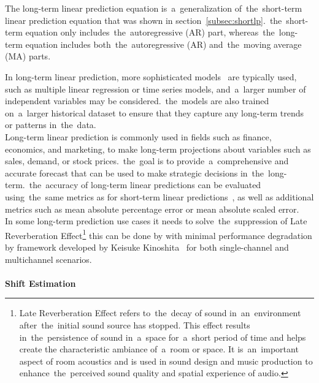 The long-term linear prediction equation is~a~generalization of~the~short-term linear prediction equation that was shown in section~\ref{subsec:shortlp}.~the~short-term equation only includes~the~autoregressive (AR) part, whereas~the~long-term equation includes both~the~autoregressive (AR) and~the~moving average (MA) parts.

In long-term linear prediction, more sophisticated models~\cite{Nave} are typically used, such as multiple linear
regression or time series models, and~a~larger number of independent variables may be considered.~the~models are also
trained on~a~larger historical dataset to ensure that they capture any long-term trends or patterns in~the~data.
\\
Long-term linear prediction is commonly used in fields such as finance, economics, and marketing, to make long-term
projections about variables such as sales, demand, or stock prices.~the~goal is to provide~a~comprehensive and accurate
forecast that can be used to make strategic decisions in~the~long-term.~the~accuracy of long-term linear predictions
can be evaluated using~the~same metrics as for short-term linear predictions~\cite{Baker}, as well as additional metrics
such as mean absolute percentage error or mean absolute scaled error.
\\
In some long-term prediction use cases it needs to solve~the~suppression of Late Reverberation
Effect\footnote{Late Reverberation Effect refers to~the~decay of sound in~an~environment after~the~initial sound source
has stopped. This effect results in~the~persistence of sound in~a~space for~a~short period of time and helps create the
characteristic ambiance of~a~room or space. It is~an~important aspect of room acoustics and is used in sound
design and music production to enhance~the~perceived sound quality and spatial experience of audio.} this can be done
by with minimal performance degradation by framework developed by Keisuke Kinoshita~\cite{Kinoshita} for both
single-channel and multichannel scenarios.\\
\\
\textbf{Shift Estimation}\\

